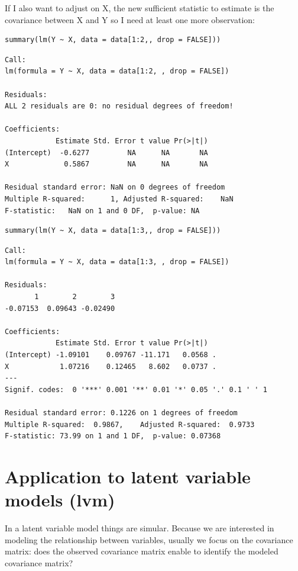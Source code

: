 \documentclass{article}
\begin{document}
If I also want to adjust on X, the new sufficient statistic to estimate is the covariance between
X and Y so I need at least one more observation:

\lstset{language=r,label= ,caption= ,captionpos=b,numbers=none}
\begin{lstlisting}
summary(lm(Y ~ X, data = data[1:2,, drop = FALSE]))
\end{lstlisting}

\begin{verbatim}
Call:
lm(formula = Y ~ X, data = data[1:2, , drop = FALSE])

Residuals:
ALL 2 residuals are 0: no residual degrees of freedom!

Coefficients:
            Estimate Std. Error t value Pr(>|t|)
(Intercept)  -0.6277         NA      NA       NA
X             0.5867         NA      NA       NA

Residual standard error: NaN on 0 degrees of freedom
Multiple R-squared:      1,	Adjusted R-squared:    NaN 
F-statistic:   NaN on 1 and 0 DF,  p-value: NA
\end{verbatim}

\lstset{language=r,label= ,caption= ,captionpos=b,numbers=none}
\begin{lstlisting}
summary(lm(Y ~ X, data = data[1:3,, drop = FALSE]))
\end{lstlisting}

\begin{verbatim}
Call:
lm(formula = Y ~ X, data = data[1:3, , drop = FALSE])

Residuals:
       1        2        3 
-0.07153  0.09643 -0.02490 

Coefficients:
            Estimate Std. Error t value Pr(>|t|)  
(Intercept) -1.09101    0.09767 -11.171   0.0568 .
X            1.07216    0.12465   8.602   0.0737 .
---
Signif. codes:  0 '***' 0.001 '**' 0.01 '*' 0.05 '.' 0.1 ' ' 1

Residual standard error: 0.1226 on 1 degrees of freedom
Multiple R-squared:  0.9867,	Adjusted R-squared:  0.9733 
F-statistic: 73.99 on 1 and 1 DF,  p-value: 0.07368
\end{verbatim}

\section{Application to latent variable models (lvm)}
\label{sec:org68b96b5}

In a latent variable model things are simular. Because we are interested in modeling the
relationship between variables, usually we focus on the covariance matrix: does the observed
covariance matrix enable to identify the modeled covariance matrix? 
\end{document}
